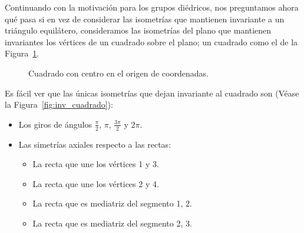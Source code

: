 \begin{ejemplo}
    Continuando con la motivación para los grupos diédricos, nos preguntamos ahora qué pasa si en vez de considerar las isometrías que mantienen invariante a un triángulo equilátero, consideramos las isometrías del plano que mantienen invariantes los vértices de un cuadrado sobre el plano; un cuadrado como el de la Figura~\ref{fig:cuadrado}.
    \begin{figure}[H]
        \centering
        \caption{Cuadrado con centro en el origen de coordenadas.}
        \label{fig:cuadrado}
    \end{figure}
    Es fácil ver que las únicas isometrías que dejan invariante al cuadrado son (Véase la Figura~\ref{fig:inv_cuadrado}):
    \begin{itemize}
        \item Los giros de ángulos $\frac{\pi}{2}$, $\pi$, $\frac{3\pi}{2}$ y $2\pi$.
        \item Las simetrías axiales respecto a las rectas:
            \begin{itemize}
                \item La recta que une los vértices 1 y 3.
                \item La recta que une los vértices 2 y 4.
                \item La recta que es mediatriz del segmento 1, 2.
                \item La recta que es mediatriz del segmento 2, 3.
            \end{itemize}
    \end{itemize}
    \begin{figure}
        \centering
\end{figure}
\end{ejemplo}
